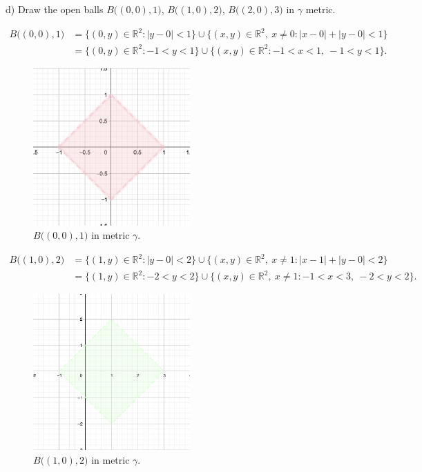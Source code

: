 \documentclass[a4paper,11pt]{article}
\begin{document}

d) Draw the open balls $B \big((0, 0), 1 \big)$, $B \big((1, 0), 2 \big)$, $B \big((2, 0), 3  \big)$ in $\gamma$ metric. 

\begin{align*} 
    B \big((0, 0), 1 \big) &= \{(0,y) \in \mathbb{R}^2 : |y - 0| < 1 \} \cup \{(x,y) \in \mathbb{R}^2 , \ x \neq 0: |x - 0| + |y - 0| < 1 \}
    \\
    &= \{(0,y) \in \mathbb{R}^2 : -1 < y < 1 \} \cup \{(x,y) \in \mathbb{R}^2 : -1 < x < 1, \ -1 < y < 1 \}.
\end{align*}

\begin{figure}[ht!]
    \centering
    \includegraphics[width=60mm]{d1.png}
    \caption{$B \big((0, 0), 1 \big)$ in metric $\gamma$.}
\end{figure}

\begin{align*} 
    B \big((1, 0), 2 \big) &= \{(1,y) \in \mathbb{R}^2 : |y - 0| < 2 \} \cup \{(x,y) \in \mathbb{R}^2, \ x \neq 1 : |x - 1| + |y - 0| < 2 \}
    \\
    &= \{(1,y) \in \mathbb{R}^2 : -2 < y < 2 \} \cup \{(x,y) \in \mathbb{R}^2 , \ x \neq 1: -1 < x < 3, \ -2 < y < 2 \}.
\end{align*}

\begin{figure}[ht!]
    \centering
    \includegraphics[width=60mm]{d2.png}
    \caption{$B \big((1, 0), 2 \big)$ in metric $\gamma$.}
\end{figure}
\end{document}
